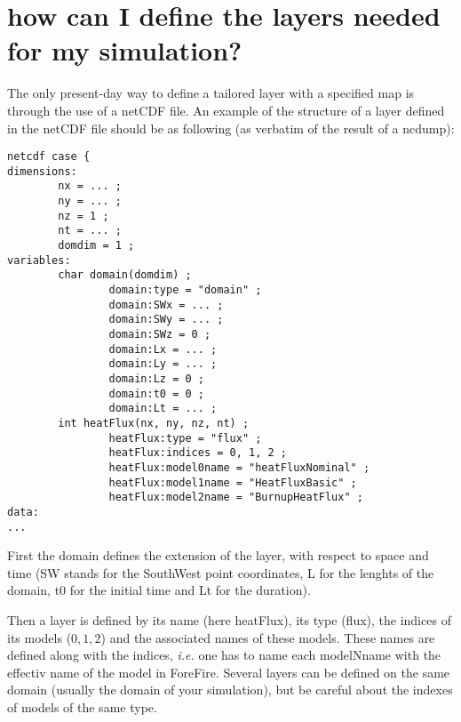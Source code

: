\begin{center}
\end{center}

\section{how can I define the layers needed for my simulation?}
\label{subsec:netCDF}

The only present-day way to define a tailored layer with a specified map is through the use of a netCDF file. An example of the structure of a layer defined in the netCDF file should be as following (as verbatim of the result of a ncdump):
\begin{lstlisting}[caption={example of layer definition in a netCDF file},frame=single]
netcdf case {
dimensions:
        nx = ... ;
        ny = ... ;
        nz = 1 ;
        nt = ... ;
        domdim = 1 ;
variables:
        char domain(domdim) ;
                domain:type = "domain" ;
                domain:SWx = ... ;
                domain:SWy = ... ;
                domain:SWz = 0 ;
                domain:Lx = ... ;
                domain:Ly = ... ;
                domain:Lz = 0 ;
                domain:t0 = 0 ;
                domain:Lt = ... ;
        int heatFlux(nx, ny, nz, nt) ;
                heatFlux:type = "flux" ;
                heatFlux:indices = 0, 1, 2 ;
                heatFlux:model0name = "heatFluxNominal" ;
                heatFlux:model1name = "HeatFluxBasic" ;
                heatFlux:model2name = "BurnupHeatFlux" ;
data:
...
\end{lstlisting}

First the domain defines the extension of the layer, with respect to space and time (SW stands for the SouthWest point coordinates, L for the lenghts of the domain, t0 for the initial time and Lt for the duration). 

Then a layer is defined by its name (here heatFlux), its type (flux), the indices of its models ($0,1,2$) and the associated names of these models. These names are defined along with the indices, \textit{i.e.} one has to name each modelNname with the effectiv name of the model in ForeFire. Several layers can be defined on the same domain (usually the domain of your simulation), but be careful about the indexes of models of the same type. 

